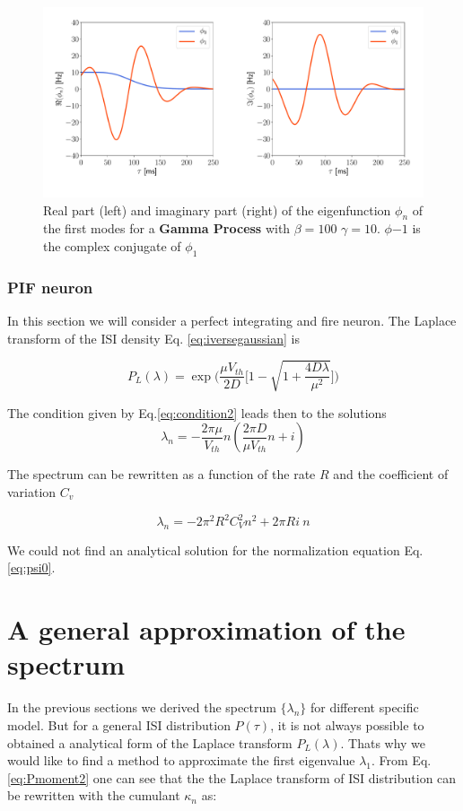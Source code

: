 \documentclass[12pt,twoside]{report}
\begin{document}
\begin{figure}[h!]
	\centering
	\includegraphics[width=0.8\linewidth]{gamma_eigenfunction.pdf}
	\caption{Real part (left) and imaginary part (right) of the eigenfunction $\phi_n$ of the first modes for a \textbf{Gamma Process} with $\beta=100$
		$\gamma=10$. $\phi{-1}$ is the complex conjugate of  $\phi_{1}$}
	\label{fig:gammaeigenfunction}
\end{figure}



\subsubsection{PIF neuron}

In this section we will consider a perfect integrating and  fire neuron. The Laplace transform of the ISI density Eq. \eqref{eq:iversegaussian} is

\begin{equation}
P_L(\lambda)=\exp\big(\frac{\mu V_{th}}{2D}\big[1-\sqrt{1+\frac{4D\lambda}{\mu^2}}\big]\big)
\end{equation}


The condition given by Eq.\eqref{eq:condition2} leads then to the solutions
\begin{equation}
\lambda_n=- \frac{2\pi\mu}{V_{th}}n( \frac{2\pi D}{\mu V_{th}}n + i)
\end{equation}

The spectrum can be rewritten as a function of the rate $R$ and the coefficient of variation $C_v$

\begin{equation}
\lambda_n=- 2\pi^2R^2C_V^2n^2+2\pi R i\:n
\end{equation}

We could not find an analytical solution for the normalization equation Eq.\ref{eq:psi0}.

\section{A general approximation of the spectrum}
In the previous sections we derived the spectrum $\{\lambda_n\}$ for different specific model. But for a general ISI distribution $P(\tau)$, it is not always possible to obtained a analytical form of the Laplace transform $P_L(\lambda)$. Thats why we would like to find a method to approximate the first eigenvalue $\lambda_1$. From Eq.\eqref{eq:Pmoment2} one can see that the the Laplace transform of ISI distribution can be rewritten with the cumulant $\kappa_n$ as:
\end{document}
